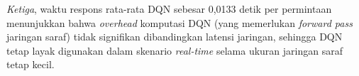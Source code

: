 \textit{Ketiga}, waktu respons rata-rata DQN sebesar 0,0133 detik per permintaan menunjukkan bahwa \textit{overhead} komputasi DQN (yang memerlukan \textit{forward pass} jaringan saraf) tidak signifikan dibandingkan latensi jaringan, sehingga DQN tetap layak digunakan dalam skenario \textit{real-time} selama ukuran jaringan saraf tetap kecil.
